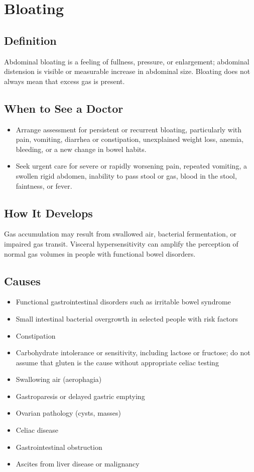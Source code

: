 \chapter{Bloating}

\section*{Definition}
Abdominal bloating is a feeling of fullness, pressure, or enlargement; abdominal distension is visible or measurable increase in abdominal size. Bloating does not always mean that excess gas is present.

\section*{When to See a Doctor}

\begin{itemize}
 \item Arrange assessment for persistent or recurrent bloating, particularly with pain, vomiting, diarrhea or constipation, unexplained weight loss, anemia, bleeding, or a new change in bowel habits.
 \item Seek urgent care for severe or rapidly worsening pain, repeated vomiting, a swollen rigid abdomen, inability to pass stool or gas, blood in the stool, faintness, or fever.
\end{itemize}

\section*{How It Develops}
Gas accumulation may result from swallowed air, bacterial fermentation, or impaired gas transit. Visceral hypersensitivity can amplify the perception of normal gas volumes in people with functional bowel disorders.

\section*{Causes}
\begin{itemize}
 \item Functional gastrointestinal disorders such as irritable bowel syndrome
 \item Small intestinal bacterial overgrowth in selected people with risk factors
 \item Constipation
 \item Carbohydrate intolerance or sensitivity, including lactose or fructose; do not assume that gluten is the cause without appropriate celiac testing
 \item Swallowing air (aerophagia)
 \item Gastroparesis or delayed gastric emptying
 \item Ovarian pathology (cysts, masses)
 \item Celiac disease
 \item Gastrointestinal obstruction
 \item Ascites from liver disease or malignancy
\end{itemize}


